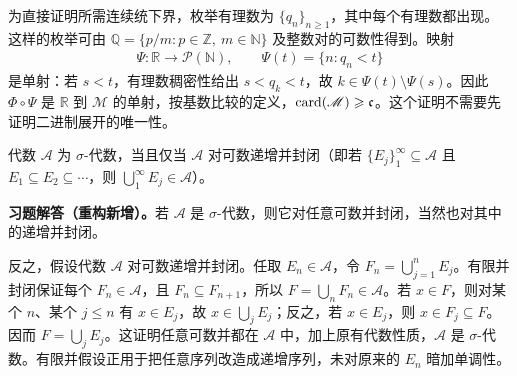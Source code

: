 \documentclass[../../main.tex]{subfiles}%
\begin{document}
\begin{solution}
\begin{enumerate}[label=\alph*.,ref=(\alph*)]
为直接证明所需连续统下界，枚举有理数为 $\{q_n\}_{n\geqslant1}$，其中每个有理数都出现。这样的枚举可由 $\mathbb{Q}=\{p/m:p\in\mathbb{Z},\ m\in\mathbb{N}\}$ 及整数对的可数性得到。映射
\begin{align*}
\Psi:\mathbb{R}\longrightarrow\mathscr{P}(\mathbb{N}),\qquad
\Psi(t)=\{n:q_n<t\}
\end{align*}
是单射：若 $s<t$，有理数稠密性给出 $s<q_k<t$，故 $k\in\Psi(t)\setminus\Psi(s)$。因此 $\Phi\circ\Psi$ 是 $\mathbb{R}$ 到 $\mathscr{M}$ 的单射，按基数比较的定义，$\operatorname{card}(\mathscr{M})\geqslant\mathfrak{c}$。这个证明不需要先证明二进制展开的唯一性。
\end{enumerate}
\end{solution}


\begin{exercise}\label{exercise:ch01-increasing-unions}
代数 $\mathscr{A}$ 为 $\sigma$-代数，当且仅当 $\mathscr{A}$ 对可数递增并封闭（即若 $\{E_j\}_1^\infty\subseteq\mathscr{A}$ 且 $E_1\subseteq E_2\subseteq\cdots$，则 $\bigcup_1^\infty E_j\in\mathscr{A}$）。
\end{exercise}
\begin{solution}
\label{solution:ch01-increasing-unions}
\textbf{习题解答（重构新增）。}若 $\mathscr{A}$ 是 $\sigma$-代数，则它对任意可数并封闭，当然也对其中的递增并封闭。

反之，假设代数 $\mathscr{A}$ 对可数递增并封闭。任取 $E_n\in\mathscr{A}$，令 $F_n=\bigcup_{j=1}^nE_j$。有限并封闭保证每个 $F_n\in\mathscr{A}$，且 $F_n\subseteq F_{n+1}$，所以 $F=\bigcup_nF_n\in\mathscr{A}$。若 $x\in F$，则对某个 $n$、某个 $j\leqslant n$ 有 $x\in E_j$，故 $x\in\bigcup_jE_j$；反之，若 $x\in E_j$，则 $x\in F_j\subseteq F$。因而 $F=\bigcup_jE_j$。这证明任意可数并都在 $\mathscr{A}$ 中，加上原有代数性质，$\mathscr{A}$ 是 $\sigma$-代数。有限并假设正用于把任意序列改造成递增序列，未对原来的 $E_n$ 暗加单调性。
\end{solution}
\end{document}
